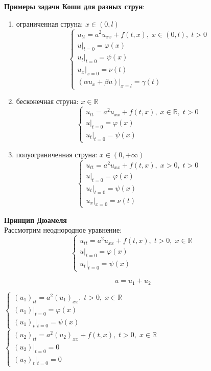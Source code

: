  \textbf{Примеры задачи Коши для разных струн}:

 \begin{enumerate}
 	\item ограниченная струна: $x \in (0, l)$
 	$$\begin{cases}
 		u_{tt} = a^2 u_{xx} + f(t,x), \; x \in (0,l), \; t > 0 \\
 		u|_{t=0} = \varphi (x) \\
 		u_t |_{t=0} = \psi (x) \\
 		u_x |_{x=0} = \nu (t) \\
 		(\alpha u_x + \beta u)|_{x=l} = \gamma (t)
 	\end{cases}$$
 	\item бесконечная струна: $x \in \mathbb{R}$
 	$$\begin{cases}
 		u_{tt} = a^2 u_{xx} + f(t,x), \; x \in \mathbb{R}, \; t > 0 \\
 		u|_{t=0} = \varphi (x) \\
 		u_t |_{t=0} = \psi (x)
 	\end{cases}$$
 	\item полуограниченная струна: $x \in (0, +\infty)$
 	$$\begin{cases}
 		u_{tt} = a^2 u_{xx} + f(t,x), \; x > 0, \; t > 0 \\
 		u|_{t=0} = \varphi (x) \\
 		u_t |_{t=0} = \psi (x) \\
 		u_x |_{x=0} = \nu (t)
 	\end{cases}$$
 \end{enumerate}

 \textbf{Принцип Дюамеля}\\

 Рассмотрим неоднородное уравнение:
$$\begin{cases}
	u_{tt} = a^2 u_{xx} + f(t,x), \; t > 0, \; x \in \mathbb{R} \\
	u|_{t=0} = \varphi (x) \\
	u_t |_{t=0} = \psi (x)
\end{cases}$$

$$u = u_1 + u_2$$

\begin{multicols}{2}
	$\begin{cases}
		(u_1)_{tt} = a^2 (u_1)_{xx}, \; t > 0, \; x \in \mathbb{R} \\
		(u_1)|_{t=0} = \varphi (x) \\
		(u_1)_t |_{t=0} = \psi (x)
	\end{cases}$
	\columnbreak
	$\begin{cases}
		(u_2)_{tt} = a^2 (u_2)_{xx} + f(t,x), \; t > 0, \; x \in \mathbb{R} \\
		(u_2)|_{t=0} = 0 \\
		(u_2)_t |_{t=0} = 0
	\end{cases}$
\end{multicols}

